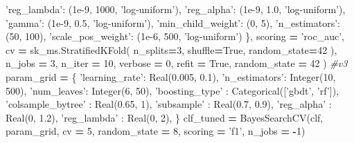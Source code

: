 \documentclass[]{book}
\newenvironment{Shaded}{\begin{snugshade}}{\end{snugshade}}
\newcommand{\DecValTok}[1]{\textcolor[rgb]{0.00,0.00,0.81}{#1}}
\newcommand{\FloatTok}[1]{\textcolor[rgb]{0.00,0.00,0.81}{#1}}
\newcommand{\StringTok}[1]{\textcolor[rgb]{0.31,0.60,0.02}{#1}}
\newcommand{\CommentTok}[1]{\textcolor[rgb]{0.56,0.35,0.01}{\textit{#1}}}
\newcommand{\VariableTok}[1]{\textcolor[rgb]{0.00,0.00,0.00}{#1}}
\newcommand{\OperatorTok}[1]{\textcolor[rgb]{0.81,0.36,0.00}{\textbf{#1}}}
\newcommand{\NormalTok}[1]{#1}
\begin{document}
\begin{Shaded}
\begin{Highlighting}[]
        \StringTok{'reg_lambda'}\NormalTok{: (}\FloatTok{1e-9}\NormalTok{, }\DecValTok{1000}\NormalTok{, }\StringTok{'log-uniform'}\NormalTok{),}
        \StringTok{'reg_alpha'}\NormalTok{: (}\FloatTok{1e-9}\NormalTok{, }\FloatTok{1.0}\NormalTok{, }\StringTok{'log-uniform'}\NormalTok{),}
        \StringTok{'gamma'}\NormalTok{: (}\FloatTok{1e-9}\NormalTok{, }\FloatTok{0.5}\NormalTok{, }\StringTok{'log-uniform'}\NormalTok{),}
        \StringTok{'min_child_weight'}\NormalTok{: (}\DecValTok{0}\NormalTok{, }\DecValTok{5}\NormalTok{),}
        \StringTok{'n_estimators'}\NormalTok{: (}\DecValTok{50}\NormalTok{, }\DecValTok{100}\NormalTok{),}
        \StringTok{'scale_pos_weight'}\NormalTok{: (}\FloatTok{1e-6}\NormalTok{, }\DecValTok{500}\NormalTok{, }\StringTok{'log-uniform'}\NormalTok{)}
\NormalTok{    \},    }
\NormalTok{    scoring }\OperatorTok{=} \StringTok{'roc_auc'}\NormalTok{,}
\NormalTok{    cv }\OperatorTok{=}\NormalTok{ sk_ms.StratifiedKFold(}
\NormalTok{        n_splits}\OperatorTok{=}\DecValTok{3}\NormalTok{,}
\NormalTok{        shuffle}\OperatorTok{=}\VariableTok{True}\NormalTok{,}
\NormalTok{        random_state}\OperatorTok{=}\DecValTok{42}
\NormalTok{    ),}
\NormalTok{    n_jobs }\OperatorTok{=} \DecValTok{3}\NormalTok{,}
\NormalTok{    n_iter }\OperatorTok{=} \DecValTok{10}\NormalTok{,   }
\NormalTok{    verbose }\OperatorTok{=} \DecValTok{0}\NormalTok{,}
\NormalTok{    refit }\OperatorTok{=} \VariableTok{True}\NormalTok{,}
\NormalTok{    random_state }\OperatorTok{=} \DecValTok{42}
\NormalTok{)}
\CommentTok{#v3}
\NormalTok{param_grid }\OperatorTok{=}\NormalTok{ \{}
    \StringTok{'learning_rate'}\NormalTok{: Real(}\FloatTok{0.005}\NormalTok{, }\FloatTok{0.1}\NormalTok{), }\StringTok{'n_estimators'}\NormalTok{: Integer(}\DecValTok{10}\NormalTok{, }\DecValTok{500}\NormalTok{),}
    \StringTok{'num_leaves'}\NormalTok{: Integer(}\DecValTok{6}\NormalTok{, }\DecValTok{50}\NormalTok{), }\StringTok{'boosting_type'}\NormalTok{ : Categorical([}\StringTok{'gbdt'}\NormalTok{, }\StringTok{'rf'}\NormalTok{]),}
    \StringTok{'colsample_bytree'}\NormalTok{ : Real(}\FloatTok{0.65}\NormalTok{, }\DecValTok{1}\NormalTok{), }\StringTok{'subsample'}\NormalTok{ : Real(}\FloatTok{0.7}\NormalTok{, }\FloatTok{0.9}\NormalTok{),}
    \StringTok{'reg_alpha'}\NormalTok{ : Real(}\DecValTok{0}\NormalTok{, }\FloatTok{1.2}\NormalTok{), }\StringTok{'reg_lambda'}\NormalTok{ : Real(}\DecValTok{0}\NormalTok{, }\DecValTok{2}\NormalTok{),}
\NormalTok{    \}}
\NormalTok{clf_tuned }\OperatorTok{=}\NormalTok{ BayesSearchCV(clf, param_grid, cv }\OperatorTok{=} \DecValTok{5}\NormalTok{, random_state }\OperatorTok{=} \DecValTok{8}\NormalTok{, scoring }\OperatorTok{=} \StringTok{'f1'}\NormalTok{, n_jobs }\OperatorTok{=} \OperatorTok{-}\DecValTok{1}\NormalTok{)}
\end{Highlighting}
\end{Shaded}
\end{document}
